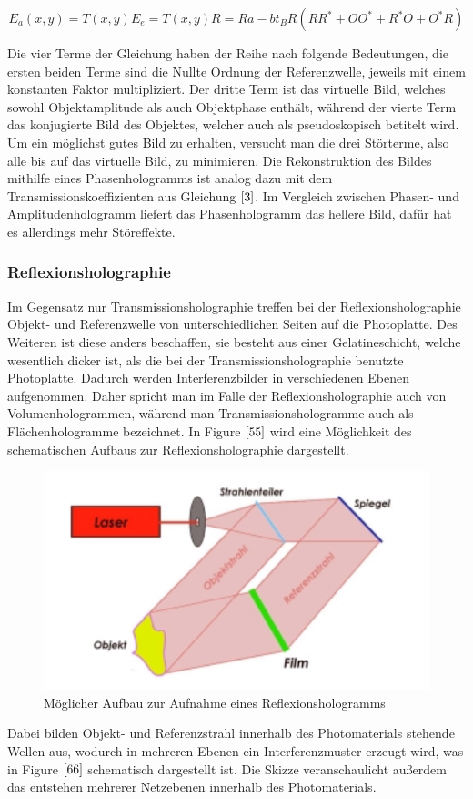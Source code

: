 \documentclass[12pt,a4paper]{article}
\begin{document}
\begin{equation}
E_{a}(x,y) = T(x,y)E_{e} = T(x,y)R = Ra-bt_{B}R(RR^{*} + OO^{*} + R^{*}O + O^{*}R)
\label {1}
\end{equation}

Die vier Terme der Gleichung haben der Reihe nach folgende Bedeutungen, die ersten beiden Terme sind die Nullte Ordnung der Referenzwelle, jeweils mit einem konstanten Faktor multipliziert. Der dritte Term ist das virtuelle Bild, welches sowohl Objektamplitude als auch Objektphase enthält, während der vierte Term das konjugierte Bild des Objektes, welcher auch als pseudoskopisch betitelt wird. Um ein möglichst gutes Bild zu erhalten, versucht man die drei Störterme, also alle bis auf das virtuelle Bild, zu minimieren. Die Rekonstruktion des Bildes mithilfe eines Phasenhologramms ist analog dazu mit dem Transmissionskoeffizienten aus Gleichung $\ref{3}$. Im Vergleich zwischen Phasen- und Amplitudenhologramm liefert das Phasenhologramm das hellere Bild, dafür hat es allerdings mehr Störeffekte. 

\subsubsection{Reflexionsholographie}

Im Gegensatz nur Transmissionsholographie treffen bei der Reflexionsholographie Objekt- und Referenzwelle von unterschiedlichen Seiten auf die Photoplatte. Des Weiteren ist diese anders beschaffen, sie besteht aus einer Gelatineschicht, welche wesentlich dicker ist, als die bei der Transmissionsholographie benutzte Photoplatte. Dadurch werden Interferenzbilder in verschiedenen Ebenen aufgenommen. Daher spricht man im Falle der Reflexionsholographie auch von Volumenhologrammen, während man Transmissionshologramme auch als Flächenhologramme bezeichnet. In Figure $\ref{55}$ wird eine Möglichkeit des schematischen Aufbaus zur Reflexionsholographie dargestellt. 
\begin{figure}[h]
	\includegraphics[scale = 0.5]{Refl.png}
	\centering
	\caption{Möglicher Aufbau zur Aufnahme eines Reflexionshologramms}
	\label{55}
\end{figure}
Dabei bilden Objekt- und Referenzstrahl innerhalb des Photomaterials stehende Wellen aus, wodurch in mehreren Ebenen ein Interferenzmuster erzeugt wird, was in Figure $\ref{66}$ schematisch dargestellt ist. Die Skizze veranschaulicht außerdem das entstehen mehrerer Netzebenen innerhalb des Photomaterials. 
\end{document}
